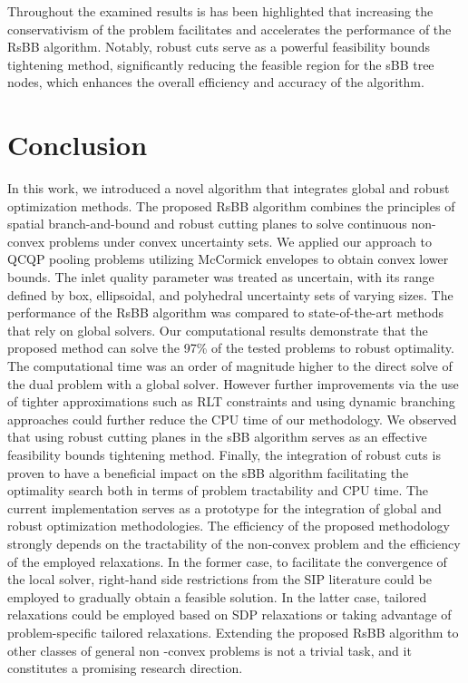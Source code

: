 \documentclass[sn-mathphys-num]{sn-jnl}
\begin{document}
Throughout the examined results is has been highlighted that increasing the conservativism of the problem facilitates and accelerates the performance of the RsBB algorithm. Notably, robust cuts serve as a powerful feasibility bounds tightening method, significantly reducing the feasible region for the sBB tree nodes, which enhances the overall efficiency and accuracy of the algorithm.


\section{Conclusion}
In this work, we introduced a novel algorithm that integrates global and robust optimization methods. The proposed RsBB algorithm combines the principles of spatial branch-and-bound and robust cutting planes to solve continuous non-convex problems under convex uncertainty sets. We applied our approach to QCQP pooling problems utilizing McCormick envelopes to obtain convex lower bounds. The inlet quality parameter was treated as uncertain, with its range defined by box, ellipsoidal, and polyhedral uncertainty sets of varying sizes. The performance of the RsBB algorithm was compared to state-of-the-art methods that rely on global solvers. Our computational results demonstrate that the proposed method can solve the 97\% of the tested problems to robust optimality. The computational time was an order of magnitude higher to the direct solve of the dual problem with a global solver. However further improvements via the use of tighter approximations such as RLT constraints and using dynamic branching approaches could further reduce the CPU time of our methodology. We observed that using robust cutting planes in the sBB algorithm serves as an effective feasibility bounds tightening method. Finally, the integration of robust cuts is proven to have a beneficial impact on the sBB algorithm facilitating the optimality search both in terms of problem tractability and CPU time. The current implementation serves as a prototype for the integration of global and robust optimization methodologies. The efficiency of the proposed methodology strongly depends on the tractability of the non-convex problem and the efficiency of the employed relaxations. In the former case, to facilitate the convergence of the local solver, right-hand side restrictions from the SIP literature could be employed to gradually obtain a feasible solution. In the latter case, tailored relaxations could be employed based on SDP relaxations or taking advantage of problem-specific tailored relaxations. Extending the proposed RsBB algorithm to other classes of general non -convex problems is not a trivial task, and it constitutes a promising research direction. 
\end{document}
